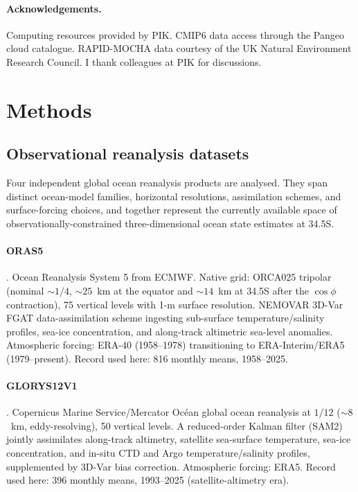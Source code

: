 \documentclass[12pt,a4paper]{article}
\begin{document}
\paragraph{Acknowledgements.}
Computing resources provided by PIK. CMIP6 data access through the
Pangeo cloud catalogue. RAPID-MOCHA data courtesy of the UK Natural
Environment Research Council. I thank colleagues at PIK for discussions.

\section*{Methods}

\subsection*{Observational reanalysis datasets}

Four independent global ocean reanalysis products are analysed. They
span distinct ocean-model families, horizontal resolutions,
assimilation schemes, and surface-forcing choices, and together
represent the currently available space of observationally-constrained
three-dimensional ocean state estimates at 34.5\textdegree S.

\paragraph{ORAS5} \citep{Zuo2019}. Ocean Reanalysis System 5 from
ECMWF. Native grid: ORCA025 tripolar (nominal
${\sim}1/4$\textdegree, ${\sim}25$~km at the equator and
${\sim}14$~km at 34.5\textdegree S after the $\cos\phi$ contraction),
75 vertical levels with 1-m surface resolution. NEMOVAR 3D-Var FGAT
data-assimilation scheme ingesting sub-surface temperature/salinity
profiles, sea-ice concentration, and along-track altimetric sea-level
anomalies. Atmospheric forcing: ERA-40 (1958--1978) transitioning to
ERA-Interim/ERA5 (1979--present). Record used here: 816 monthly means,
1958--2025.

\paragraph{GLORYS12V1} \citep{Lellouche2021}. Copernicus Marine
Service/Mercator Oc\'ean global ocean reanalysis at
$1/12$\textdegree{} (${\sim}8$~km, eddy-resolving), 50 vertical
levels. A reduced-order Kalman filter (SAM2) jointly assimilates
along-track altimetry, satellite sea-surface temperature, sea-ice
concentration, and in-situ CTD and Argo temperature/salinity
profiles, supplemented by 3D-Var bias correction. Atmospheric
forcing: ERA5. Record used here: 396 monthly means, 1993--2025
(satellite-altimetry era).
\end{document}
